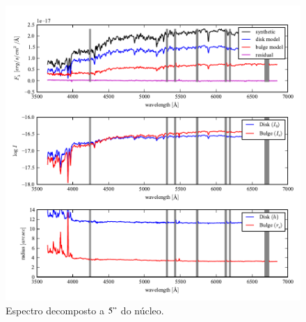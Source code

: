 \begin{figure}
	\includegraphics{figuras/decomp-model-quality}
	\caption[Espectro decomposto a $5"$ do núcleo] {Espectro decomposto a $5"$ do
	núcleo.}
	\label{fig:decompSpectra}
\end{figure}


